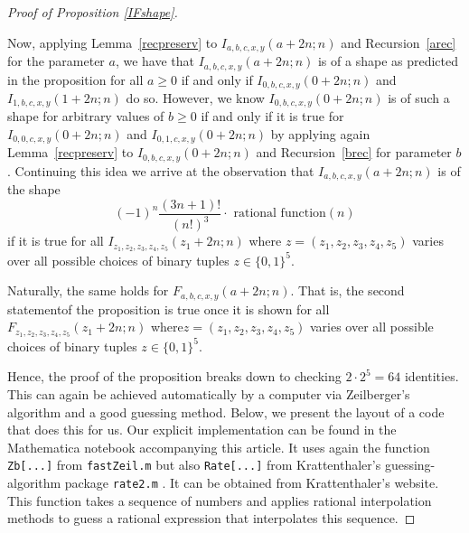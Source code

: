 \documentclass{amsart}
\numberwithin{equation}{section}
\begin{document}
\begin{proof}[Proof of Proposition \ref{IFshape}]
\begin{itemize}
    \end{itemize}
    Now, applying Lemma~\ref{recpreserv} to $I_{a,b,c,x,y}(a+2n;n)$ and Recursion~\eqref{arec} for the parameter $a$, we have that $I_{a,b,c,x,y}(a+2n;n)$ is of a shape as predicted in the proposition for all $a\geq 0$ if and only if $I_{0,b,c,x,y}(0+2n;n)$ and $I_{1,b,c,x,y}(1+2n;n)$ do so. 
    However, we know $I_{0,b,c,x,y}(0+2n;n)$ is of such a shape for arbitrary values of $b\geq 0$ if and only if it is true for $I_{0,0,c,x,y}(0+2n;n)$ and $I_{0,1,c,x,y}(0+2n;n)$ by applying again Lemma~\ref{recpreserv} to $I_{0,b,c,x,y}(0+2n;n)$ and Recursion~\eqref{brec} for parameter $b$.
    Continuing this idea we arrive at the observation that $I_{a,b,c,x,y}(a+2n;n)$ is of the shape
    \[(-1)^n\frac{(3n+1)!}{(n!)^3}\cdot \text{ rational function}(n)\]
    if it is true for all $I_{z_1,z_2,z_3,z_4,z_5}(z_1+2n;n)$ where $z=(z_1,z_2,z_3,z_4,z_5)$ varies over all possible choices of binary tuples $z\in\{0,1\}^5$.

    Naturally, the same holds for $F_{a,b,c,x,y}(a+2n;n)$. That is, the second statement\break of the proposition is true once it is shown for all $F_{z_1,z_2,z_3,z_4,z_5}(z_1+2n;n)$ where\break $z=(z_1,z_2,z_3,z_4,z_5)$ varies over all possible choices of binary tuples $z\in\{0,1\}^5$.

    Hence, the proof of the proposition breaks down to checking $2\cdot 2^5=64$ identities. This can again be achieved automatically by a computer via Zeilberger's algorithm and a good guessing method. Below, we present the layout of a code that does this for us. Our explicit implementation can be found in the Mathematica notebook accompanying this article. It uses again the function \texttt{Zb[...]} from \texttt{fastZeil.m} but also \texttt{Rate[...]} from Krattenthaler's guessing-algorithm package \texttt{rate2.m} \cite{AdvancedDet}. It can be obtained from Krattenthaler's website. This function takes a sequence of numbers and applies rational interpolation methods to guess a rational expression that interpolates this sequence. 


\end{proof}
\end{document}
